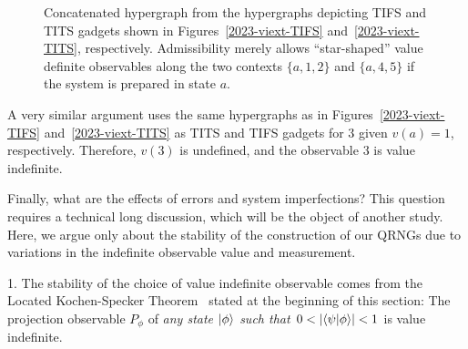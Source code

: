 \documentclass[%
 superscriptaddress,
  preprint,
 showpacs,
 showkeys,
 nofootinbib,
  amsmath,amssymb,
  aps,
 pra,
  longbibliography,
  floatfix,
 ]{revtex4-2}
\theoremstyle{definition}
\begin{document}
\begin{figure}
                \begin{center}
                \end{center}
                \caption{Concatenated hypergraph from the hypergraphs depicting TIFS and TITS gadgets shown in Figures~\ref{2023-viext-TIFS} and~\ref{2023-viext-TITS},
respectively. Admissibility merely allows ``star-shaped'' value definite observables along the two contexts $\{a,1,2\}$ and $\{a,4,5\}$
if the system is prepared in state $a$.
}
                \label{2023-viext-TIFS&TITSconcatenated}
        \end{figure}

A very similar argument uses the same hypergraphs as in Figures~\ref{2023-viext-TIFS}
and~\ref{2023-viext-TITS} as TITS and TIFS gadgets for $3$ given $v(a)=1$, respectively.
Therefore, $v(3)$ is undefined, and the observable $3$ is value indefinite.


Finally, what are the effects of errors and system imperfections?
This question requires a technical long discussion, which will be the object of another study. Here, we argue only about the stability of the construction of our QRNGs due to variations in the indefinite observable value and measurement.


1. The stability of the choice of value indefinite observable comes from the Located Kochen-Specker Theorem~\cite{2012-incomput-proofsCJ,2015-AnalyticKS} stated at the beginning of this section:
The projection observable $P_\phi$ of {\it any state $\ket{\phi}$ such that {\rm $0<\abs{\bra{\psi}\ket{\phi}}<1$}}
is value
indefinite.
\end{document}
